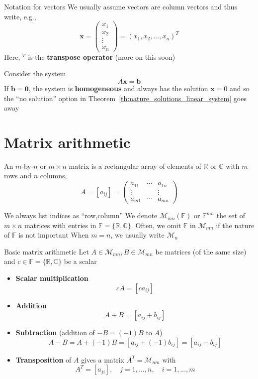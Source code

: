 \documentclass{beamer}
\def\IC{\mathbb{C}}
\def\IF{\mathbb{F}}
\def\IR{\mathbb{R}}
\def\bb{\mathbf{b}}
\def\bx{\mathbf{x}}
\def\b0{\mathbf{0}}
\def\M{\mathcal{M}}
\begin{document}
\begin{frame}{Notation for vectors}
We usually assume vectors are column vectors and thus write, e.g.,
\[ 
\bx=
\begin{pmatrix}
x_1\\ x_2 \\ \vdots \\ x_n
\end{pmatrix}
= (x_1,x_2,\ldots,x_n)^T
\]
Here, $^T$ is the \textbf{transpose operator} (more on this soon)
\end{frame}



\begin{frame}
Consider the system
\[
A\bx=\bb
\]
\vfill
If $\bb=\b0$, the system is \textbf{homogeneous} and always has the solution $\bx=0$ and so the ``no solution'' option in Theorem~\ref{th:nature_solutions_linear_system} goes away
\end{frame}


\section{Matrix arithmetic}

\begin{frame}
	\begin{definition}[Matrix]
		An $m$-by-$n$ or $m\times n$ matrix is a rectangular array of elements of $\IR$ or $\IC$ with $m$ rows and $n$ columns,
		\[
		A=[a_{ij}]=
		\begin{pmatrix}
		a_{11} & \cdots & a_{1n} \\
		\vdots & & \vdots \\
		a_{m1} & \cdots & a_{mn}
		\end{pmatrix}
		\]
	\end{definition}
	\vfill
	We always list indices as ``row,column''
	\vfill
	We denote $\M_{mn}(\IF)$ or $\IF^{mn}$ the set of $m\times n$ matrices with entries in $\IF=\{\IR,\IC\}$. Often, we omit $\IF$ in $\M_{mn}$ if the nature of $\IF$ is not important
	\vfill
	When $m=n$, we usually write $\M_n$
\end{frame}

\begin{frame}{Basic matrix arithmetic}
Let $A\in\M_{mn},B\in\M_{mn}$ be matrices (of the same size) and $c\in\IF=\{\IR,\IC\}$ be a scalar
\begin{itemize}
	\item \textbf{Scalar multiplication}
	\[
	cA = [ca_{ij}]
	\]
	\item \textbf{Addition}
	\[
	A+B = [a_{ij}+b_{ij}]
	\]
	\item \textbf{Subtraction} (addition of $-B=(-1)B$ to $A$)
	\[
	A-B=A+(-1)B=[a_{ij}+(-1)b_{ij}]=[a_{ij}-b_{ij}]
	\]
	\item \textbf{Transposition} of $A$ gives a matrix $A^T=\M_{nm}$ with
	\[
	A^T=[a_{ji}],\quad j=1,\ldots,n,\quad i=1,\ldots,m
	\]
\end{itemize}
\end{frame}
\end{document}

